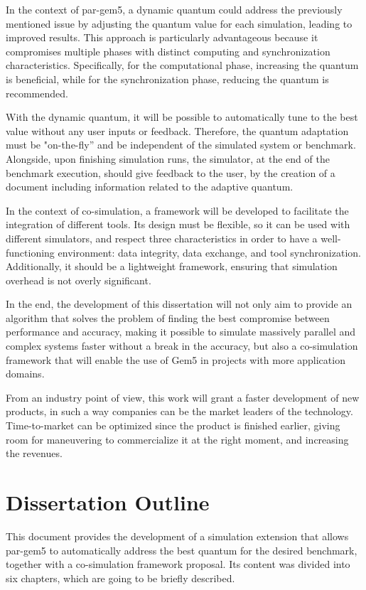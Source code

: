 In the context of par-gem5, a dynamic quantum could address the previously mentioned issue by adjusting the quantum value for each simulation, 
leading to improved results. 
This approach is particularly advantageous because it compromises multiple phases with distinct computing and synchronization 
characteristics. Specifically, for the computational phase, increasing the quantum is beneficial, while for the synchronization phase, 
reducing the quantum is recommended.

With the dynamic quantum, it will be possible to automatically tune to the best value without any user inputs or feedback. 
Therefore, the quantum adaptation must be "on-the-fly” and be independent of the simulated system or benchmark. 
Alongside, upon finishing simulation runs, the simulator, at the end of the benchmark execution, should give feedback to the user, 
by the creation of a document including information related to the adaptive quantum.

In the context of co-simulation, a framework will be developed to facilitate the integration of different tools. Its design 
must be flexible, so it can be used with different simulators, and respect three characteristics in order to have a well-functioning
environment: data integrity, data exchange, and tool synchronization. Additionally, it should be a lightweight framework, 
ensuring that simulation overhead is not overly significant.

In the end, the development of this dissertation will not only aim to provide an algorithm that solves the problem of 
finding the best compromise between performance and accuracy, making it possible to simulate 
massively parallel and complex systems faster without a break in the accuracy, but also a co-simulation framework that will enable the use 
of Gem5 in projects with more application domains.

From an industry point of view, this work will grant a faster development of new products, in such a way companies can be the market leaders 
of the technology. Time-to-market can be optimized since the product is finished earlier, giving room for maneuvering to commercialize it at the 
right moment, and increasing the revenues.
 
\section{Dissertation Outline}

This document provides the development of a simulation extension that allows par-gem5 to automatically address the best quantum for the desired 
benchmark, together with a co-simulation framework proposal. Its content was divided into six chapters, which are going to be briefly described.

